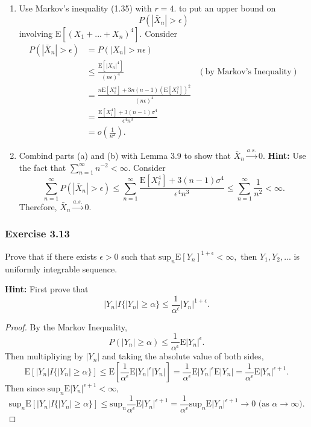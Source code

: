 \documentclass[12pt,]{article}
\begin{document}
\begin{enumerate}
\def\labelenumi{(\alph{enumi})}
\setcounter{enumi}{1}
\item
  Use Markov's inequality (1.35) with \(r = 4.\) to put an upper bound
  on \[P(|\bar X_n| > \epsilon)\] involving
  \(\text{E}[(X_1+...+X_n)^4].\) Consider \begin{align*}
  P\left(|\bar X_n| > \epsilon \right) &= P\left(|X_n| > n\epsilon\right)\\
  & \le \frac{\text{E}[|X_n|^4]}{(n\epsilon)^4} & (\text{by Markov's Inequality})\\
  & = \frac{n\text{E}[X_i^4]+3n(n-1)\left(\text{E}[X_i^2]\right)^2}{(n\epsilon)^4}\\
  & = \frac{\text{E}[X_i^4]+3(n-1)\sigma^4}{\epsilon^4 n^3}\\
  & = o\left(\frac{1}{n^2}\right).
  \end{align*}
\item
  Combind parts (a) and (b) with Lemma 3.9 to show that
  \(\bar X_n \overset{a.s.}\rightarrow 0.\) \textbf{Hint:} Use the fact
  that \(\sum_{n=1}^\infty n^{-2} < \infty.\) Consider
  \[\sum_{n=1}^\infty P\left(|\bar X_n|> \epsilon\right) \le \sum_{n=1}^\infty \frac{\text{E}[X_i^4]+3(n-1)\sigma^4}{\epsilon^4 n^3} \le \sum_{n=1}^\infty\frac{1}{n^2} <\infty.\]
  Therefore, \(\bar X_n \overset{a.s.}\rightarrow 0.\)
\end{enumerate}

\hypertarget{exercise-3.13}{%
\subsubsection{Exercise 3.13}\label{exercise-3.13}}

Prove that if there exists \(\epsilon > 0\) such that
\(\text{sup}_n\text{E}[Y_n]^{1+\epsilon} < \infty,\) then
\(Y_1, Y_2, ...\) is uniformly integrable sequence.

\textbf{Hint:} First prove that
\[|Y_n|I\{|Y_n| \ge \alpha \} \le \frac{1}{\alpha^\epsilon}|Y_n|^{1+\epsilon}.\]

\begin{proof}
By the Markov Inequality, 
$$P(|Y_n| \ge \alpha ) \le \frac{1}{\alpha^\epsilon}\text{E}|Y_n|^{\epsilon}.$$ Then multipliying by $|Y_n|$ and taking the absolute value of both sides,
$$\text{E}\left[|Y_n|I\{|Y_n| \ge \alpha\}\right] \le \text{E}\left[\frac{1}{\alpha^\epsilon}\text{E}|Y_n|^\epsilon |Y_n|\right]=\frac{1}{\alpha^\epsilon}\text{E}|Y_n|^\epsilon \text{E}|Y_n|=\frac{1}{\alpha^\epsilon}\text{E}|Y_n|^{\epsilon+1}.$$
Then since $\text{sup}_n \text{E}|Y_n|^{\epsilon+1} < \infty,$
$$\text{sup}_n\text{E}\left[|Y_n|I\{|Y_n| \ge \alpha\}\right]\le \text{sup}_n \frac{1}{\alpha^\epsilon}\text{E}|Y_n|^{\epsilon+1}=\frac{1}{\alpha^\epsilon}\text{sup}_n \text{E}|Y_n|^{\epsilon+1}\rightarrow 0 \text{  (as } \alpha \rightarrow\infty).$$
\end{proof}
\end{document}
